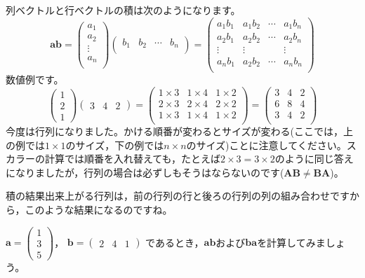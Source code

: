 \documentclass{ltjsbook}
\begin{document}
列ベクトルと行ベクトルの積は次のようになります。
\[
	\bm{a} \bm{b} =
	\begin{pmatrix}
		a_1    \\
		a_2    \\
		\vdots \\
		a_n    \\
	\end{pmatrix}
	\begin{pmatrix}
		b_1 & b_2 & \cdots & b_n \\
	\end{pmatrix}
	=
	\begin{pmatrix}
		a_1 b_1 & a_1 b_2 & \cdots & a_1 b_n \\
		a_2 b_1 & a_2 b_2 & \cdots & a_2 b_n \\
		\vdots  & \vdots  &        & \vdots  \\
		a_n b_1 & a_2 b_2 & \cdots & a_n b_n \\
	\end{pmatrix}
\]
数値例です。
\[
	\begin{pmatrix}
		1 \\2\\1
	\end{pmatrix}
	\begin{pmatrix}
		3 & 4 & 2
	\end{pmatrix}
	=
	\begin{pmatrix}
		1 \times 3 & 1 \times 4 & 1 \times 2 \\
		2 \times 3 & 2 \times 4 & 2 \times 2 \\
		1 \times 3 & 1 \times 4 & 1 \times 2 \\
	\end{pmatrix}
	=
	\begin{pmatrix}
		3 & 4 & 2 \\
		6 & 8 & 4 \\
		3 & 4 & 2 \\
	\end{pmatrix}
\]
今度は行列になりました。かける順番が変わるとサイズが変わる(ここでは，上の例では$1\times 1$のサイズ，下の例では$n \times n$のサイズ)ことに注意してください。スカラーの計算では順番を入れ替えても，たとえば$2 \times 3=3\times 2$のように同じ答えになりましたが，行列の場合は必ずしもそうはならないのです($\bm{AB} \neq \bm{BA}$)。

積の結果出来上がる行列は，前の行列の行と後ろの行列の列の組み合わせですから，このような結果になるのですね。


\begin{reidai}{}{}

	$\bm{a} = \begin{pmatrix} 1  \\ 3 \\ 5 \end{pmatrix}$，
	$\bm{b} = \begin{pmatrix} 2 & 4 & 1\end{pmatrix}$
	であるとき，$\bm{ab}$および$\bm{ba}$を計算してみましょう。

\end{reidai}
\end{document}
